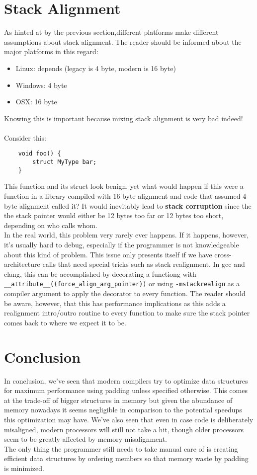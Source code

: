 \documentclass[a4paper,12pt]{scrartcl}
\begin{document}
\section{Stack Alignment}
As hinted at by the previous section,different platforms make different assumptions about stack 
alignment. The reader should be informed about the major platforms in this regard:
\begin{itemize}
    \item Linux: depends (legacy is 4 byte, modern is 16 byte)
    \item Windows: 4 byte
    \item OSX: 16 byte
\end{itemize}
Knowing this is important because mixing stack alignment is very bad indeed!
\\
\\
Consider this:
\begin{listing}[H]
    \begin{verbatim}
    void foo() {
        struct MyType bar;
    }
    \end{verbatim}
\end{listing}
This function and its struct look benign, yet what would happen if this were a function in a
library compiled with 16-byte alignment and code that assumed 4-byte alignment called it?
It would inevitably lead to \textbf{stack corruption} since the the stack pointer would either be
12 bytes too far or 12 bytes too short, depending on who calls whom.
\\
In the real world, this problem very rarely ever happens. If it happens, however, it's usually hard
to debug, especially if the programmer is not knowledgeable about this kind of problem. This issue 
only presents itself if we have cross-architecture calls that need special tricks such as
stack realignment. In gcc and clang, this can be accomplished by decorating a functiong with
\verb|__attribute__((force_align_arg_pointer))| or using \verb|-mstackrealign| as a compiler
argument to apply the decorator to every function. The reader should be aware, however, that this
has performance implications as this adds a realignment intro/outro routine to every function to
make sure the stack pointer comes back to where we expect it to be.

\section{Conclusion}
In conclusion, we've seen that modern compilers try to optimize data structures for maximum
performance using padding unless specified otherwise. This comes at the trade-off of bigger
structures in memory but given
the abundance of memory nowadays it seems negligible in comparison to the potential speedups this
optimization may have. We've also seen that even in case code is deliberately misaligned, modern
processors will still not take a hit, though older processors seem to be greatly affected by memory
misalignment.
\\
The only thing the programmer still needs to take manual care of is creating efficient data structures 
by ordering members so that memory waste by padding is minimized.
\end{document}
